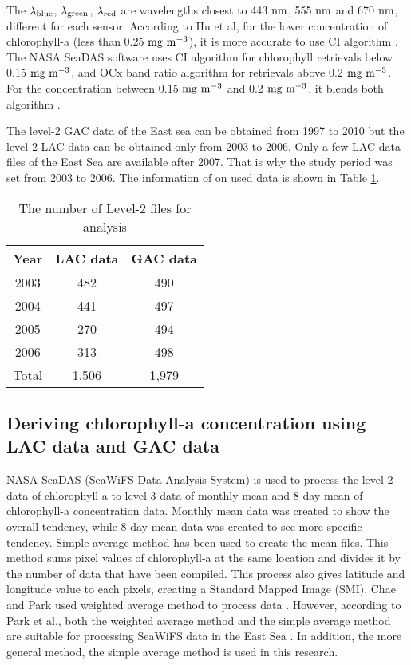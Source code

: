 The $\rm {\lambda}_{blue}$, $\rm {\lambda}_{green}$, $\rm {\lambda}_{red}$ are wavelengths closest to 443 $\rm nm$, 555 $\rm nm$ and 670 $\rm nm$, different for each sensor. According to Hu et al, for the lower concentration of chlorophyll-a (less than 0.25 $\rm mg~m^{-3}$), it is more accurate to use CI algorithm \cite{hu2012chlorophyll}. The NASA SeaDAS software uses CI algorithm for chlorophyll retrievals below 0.15 $\rm mg~m^{-3}$, and OCx band ratio algorithm for retrievals above 0.2 $\rm mg~m^{-3}$. For the concentration between 0.15 $\rm mg~m^{-3}$ and 0.2 $\rm mg~m^{-3}$, it blends both algorithm \cite{NASASeaFiWSdata}.


The level-2 GAC data of the East sea can be obtained from 1997 to 2010 but the level-2 LAC data can be obtained only from 2003 to 2006. Only a few LAC data files of the East Sea are available after 2007. That is why the study period was set from 2003 to 2006. The information of on used data is shown in Table \ref{data_information}.


 \begin{table}[h]
	\centering
	\caption{The number of Level-2 files for analysis}
	\label{data_information}
	\begin{tabular}{c  c  c  }
		\toprule
		Year & LAC data  & GAC data \\ %
		\midrule
		2003 & 482 & 490 \\ %
		2004 & 441 & 497 \\ %
		2005 & 270 & 494 \\ %
		2006 & 313 & 498 \\ %
			\midrule
		Total & 1,506 & 1,979 \\ %
		\bottomrule
	\end{tabular}
\end{table}




\hfill \break


 \subsection{Deriving chlorophyll-a concentration using LAC data and GAC data}
 
NASA SeaDAS (SeaWiFS Data Analysis System) is used to process the level-2 data of chlorophyll-a to level-3 data of monthly-mean and 8-day-mean of chlorophyll-a concentration data. Monthly mean data was created to show the overall tendency, while 8-day-mean data was created to see more specific tendency. Simple average method has been used to create the mean files. This method sums pixel values of chlorophyll-a at the same location and divides it by the number of data that have been compiled. This process also gives latitude and longitude value to each pixels, creating a Standard Mapped Image (SMI). Chae and Park used weighted average method to process data \cite{chae2009characteristics}. However, according to Park et al., both the weighted average method and the simple average method are suitable for processing SeaWiFS data in the East Sea \cite{park2012comparison}. In addition, the more general method, the simple average method is used in this research.


